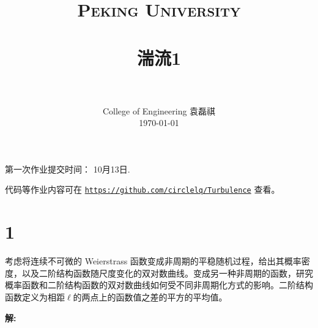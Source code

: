 \documentclass[12pt]{ctexart}
\title{
	\vspace{-1in} 	
	\usefont{OT1}{bch}{b}{n}
	\normalfont \normalsize \textsc{\LARGE Peking University}\\[1cm] %
	\horrule{0.5pt} \\[0.5cm]
	\huge \bfseries{湍流1} \\
	\horrule{2pt} \\[0.5cm]
}
\author{
	\normalfont 								\normalsize
	College of Engineering \quad 2001111690  \quad 袁磊祺\\	\normalsize
	\today
}
\date{}
\begin{document}


\maketitle

第一次作业提交时间： 10月13日.

代码等作业内容可在 \texttt{\href{https://github.com/circlelq/Turbulence}{https://github.com/circlelq/Turbulence}} 查看。

\section{1}

考虑将连续不可微的 Weierstrass 函数变成非周期的平稳随机过程，给出其概率密度，以及二阶结构函数随尺度变化的双对数曲线。变成另一种非周期的函数，研究概率函数和二阶结构函数的双对数曲线如何受不同非周期化方式的影响。二阶结构函数定义为相距$\ell$的两点上的函数值之差的平方的平均值。

\textsf{\hspace{-2em}\sf  \textbf{解:}}
\end{document}
